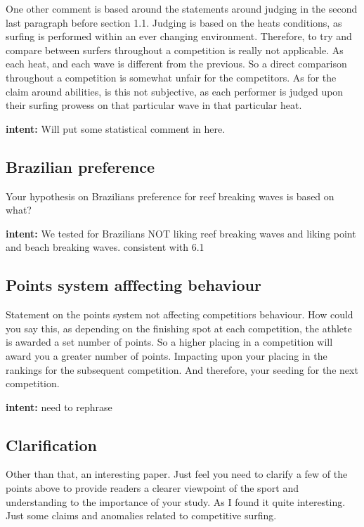 \documentclass[12pt]{article}
\begin{document}
One other comment is based around the statements around judging in the
second last paragraph before section 1.1. Judging is based on the
heats conditions, as surfing is performed within an ever changing
environment. Therefore, to try and compare between surfers throughout
a competition is really not applicable. As each heat, and each wave is
different from the previous. So a direct comparison throughout a
competition is somewhat unfair for the competitors. As for the claim
around abilities, is this not subjective, as each performer is judged
upon their surfing prowess on that particular wave in that particular
heat.


{\bf intent:}  Will put some statistical comment in here.


\subsection*{Brazilian preference}


Your hypothesis on Brazilians preference for reef breaking waves is based on what? 


{\bf intent: } We tested for Brazilians NOT liking reef breaking waves
and liking point and beach breaking waves.  consistent with 6.1

\subsection*{Points system afffecting behaviour}


Statement on the points system not affecting competitiors
behaviour. How could you say this, as depending on the finishing spot
at each competition, the athlete is awarded a set number of points. So
a higher placing in a competition will award you a greater number of
points. Impacting upon your placing in the rankings for the subsequent
competition. And therefore, your seeding for the next competition.



{\bf intent: } need to rephrase

\subsection*{Clarification}


Other than that, an interesting paper. Just feel you need to clarify a
few of the points above to provide readers a clearer viewpoint of the
sport and understanding to the importance of your study. As I found it
quite interesting. Just some claims and anomalies related to
competitive surfing.
  
\end{document}
